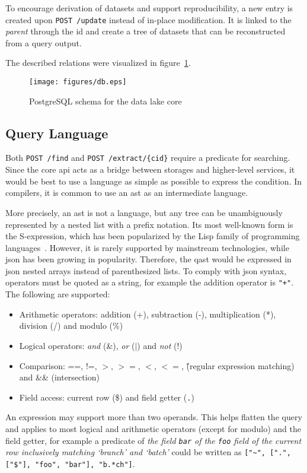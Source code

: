 To encourage derivation of datasets and support reproducibility, a new entry
is created upon \verb|POST /update| instead of in-place modification.  It is
linked to the \emph{parent} through the \gls{id} and create a \gls{tree}
of datasets that can be reconstructed from a query output.

The described relations were visualized in figure~\ref{db}.

\begin{figure}
  \texttt{[image: figures/db.eps]}
  \caption{PostgreSQL schema for the data lake core}
  \label{db}
\end{figure}

\subsection{Query Language}
Both \verb|POST /find| and \verb|POST /extract/{cid}| require a \gls{predicate}
for searching.  Since the core \gls{api} acts as a bridge between storages
and higher-level services, it would be best to use a language as simple
as possible to express the condition.  In compilers, it is common to use
an \gls{ast} as an intermediate language.

More precisely, an \gls{ast} is not a language, but any tree can
be unambiguously represented by a nested list with a prefix notation.
Its most well-known form is the S-expression, which has been popularized
by the Lisp family of programming languages~\cite{sexpr}.  However, it is
rarely supported by mainstream technologies, while \gls{json} has been
growing in popularity.  Therefore, the \gls{qast} would be expressed
in \gls{json} nested arrays instead of parenthesized lists.  To comply
with \gls{json} syntax, operators must be quoted as a string, for example
the addition operator is \verb|"+"|.  The following are supported:
\begin{itemize}
  \item Arithmetic operators: addition (+), subtraction (-), multiplication (*),
    division (/) and modulo (\%)
  \item Logical operators: \emph{and} (\&), \emph{or} ($\vert$)
    and \emph{not} (!)
  \item Comparison: ==, !=, $>$, $>=$, $<$, $<=$,
    \~ (regular expression matching) and \&\& (intersection)
  \item Field access: current row (\$) and field getter (\verb|.|)
\end{itemize}

An expression may support more than two operands.  This helps flatten the query
and applies to most logical and arithmetic operators (except for modulo)
and the field getter, for example a predicate of \emph{the field \texttt{bar}
of the \texttt{foo} field of the current row inclusively matching `branch' and
`batch'} could be written as \verb|["~", [".", ["$"], "foo", "bar"], "b.*ch"]|.

